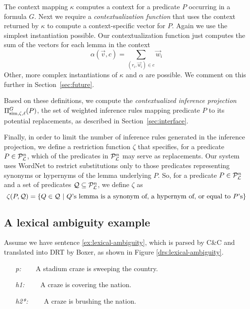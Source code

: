 The context mapping $\kappa$ computes a context for a predicate $P$
occurring in a formula $G$. Next we require a 
\textit{contextualization function} that uses the context returned by
$\kappa$ to compute a context-specific vector for $P$. Again we use
the simplest instantiation possible. Our contextualization
function just computes the sum of the vectors for each lemma in the context \[ \alpha(\vec v,
c) = \sum_{(r_i, \vec w_i) \in c} \vec w_i \]  Other, more complex
instantiations of $\kappa$ and $\alpha$ are possible. We comment on
this further in Section~\ref{sec:future}. 

Based on these definitions, we compute the \textit{contextualized
inference projection} $\Pi^G_{\mathrm{sim},\zeta,\ell}(P)$, the set of weighted
inference rules mapping predicate $P$ to its potential replacements,
as described in Section~\ref{sec:interface}.

Finally, in order to limit the number of inference rules generated in the
inference projection, we define a restriction function $\zeta$ that specifies,
for a predicate $P \in {\cal{P}}_{{\cal{L}}}^n$, which of the predicates in
${\cal{P}}_{{\cal{L}}}^n$ may serve as replacements.  Our system uses WordNet
\citep{miller:wordnet2009} to restrict substitutions only to those predicates
representing synonyms or hypernyms of the lemma underlying $P$.  So, for a
predicate $P \in {\cal{P}}_{{\cal{L}}}^n$ and a set of predicates ${\cal Q}
\subseteq {\cal{P}}_{{\cal{L}}}^n$, we define $\zeta$ as \[ \zeta(P,{\cal Q}) = \{
Q \in {\cal Q} ~|~ Q\text{'s lemma is a synonym of, a hypernym of, or equal to
}P\text{'s} \} \]


\subsection*{A lexical ambiguity example}

Assume we have sentence \eqref{ex:lexical-ambiguity}, which is parsed by C\&C
and translated into DRT by Boxer, as shown in Figure
\ref{drs:lexical-ambiguity}.

\begin{covex}\label{ex:lexical-ambiguity}
\begin{itemize} \itemsep -3pt
  \item[{\it p:}]~~~  A stadium craze is sweeping the country.
  \item[{\it h1:}]~~~~A craze is covering the nation.
  \item[{\it h2*:}]~~~~A craze is brushing the nation.
\end{itemize}
\end{covex}


